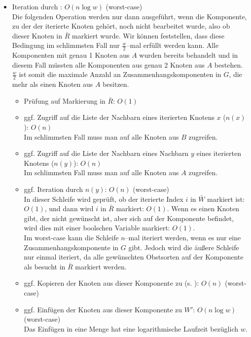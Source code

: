 \begin{itemize}
\begin{itemize}
    \item Iteration durch : $O(n \log w)$ (worst-case)\\
    Die folgenden Operation werden nur dann ausgeführt, wenn die Komponente,
    zu der der iterierte Knoten gehört, noch nicht bearbeitet wurde, also 
    ob dieser Knoten in $\bar{R}$ markiert wurde. Wir können feststellen, 
    dass diese Bedingung im schlimmsten Fall nur $\frac{w}{2}$--mal erfüllt werden kann.
    Alle Komponenten mit genau 1 Knoten aus $A$ wurden bereits behandelt und in diesem
    Fall müssten alle Komponenten aus genau 2 Knoten aus $A$ bestehen.
    $\frac{w}{2}$ ist somit die maximale Anzahl an Zusammenhangskomponenten in $G$,
    die mehr als einen Knoten aus $A$ besitzen.
    \begin{itemize}
    \item Prüfung auf Markierung in $\bar{R}$: $O(1)$

    \item ggf. Zugriff auf die Liste der Nachbarn eines iterierten Knotens $x$ ($n(x)$): $O(n)$\\
    Im schlimmsten Fall muss man auf alle Knoten aus $B$ zugreifen.

    \item ggf. Zugriff auf die Liste der Nachbarn eines Nachbarn $y$ eines iterierten Knotens ($n(y)$): $O(n)$\\
    Im schlimmsten Fall muss man auf alle Knoten aus $A$ zugreifen.

    \item ggf. Iteration durch $n(y)$: $O(n)$ (worst-case)\\
    In dieser Schleife wird geprüft, ob der iterierte Index $i$ in $\bar{W}$ markiert ist: $O(1)$,
    und dann wird $i$ in $\bar{R}$ markiert: $O(1)$. Wenn es einen Knoten gibt, der nicht gewünscht ist,
    aber sich auf der Komponente befindet, wird dies mit einer boolschen Variable  markiert: $O(1)$.\\
    Im worst-case kann die Schleife $n$--mal iteriert werden, wenn es nur eine Zusammenhangskomponente
    in $G$ gibt. Jedoch wird die äußere Schleife nur einmal iteriert, da alle gewünschten 
    Obstsorten auf der Komponente als besucht in $\bar{R}$ markiert werden.
    \item ggf. Kopieren der Knoten aus dieser Komponente zu  (s. ): $O(n)$ (worst-case)

    \item ggf. Einfügen der Knoten aus dieser Komponente zu $W'$: $O(n \log w)$ (worst-case)\\
    Das Einfügen in eine Menge hat eine logarithmische Laufzeit bezüglich $w$.


\end{itemize}
\end{itemize}
\end{itemize}
